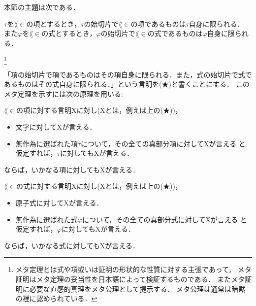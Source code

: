 	本節の主題は次である．
	\begin{screen}
		\begin{metathm}[始切片の一意性]\label{metathm:initial_segment_L_in}
			$\tau$を$\lang{\in}$の項とするとき，$\tau$の始切片で$\lang{\in}$の項であるものは$\tau$自身に限られる．
			また$\varphi$を$\lang{\in}$の式とするとき，$\varphi$の始切片で$\lang{\in}$の式であるものは$\varphi$自身に限られる．
		\end{metathm}
	\end{screen}
	
	\footnote[0]{
		メタ定理とは式や項或いは証明の形状的な性質に対する主張であって，
		メタ証明はメタ定理の妥当性を日本語によって検証するものである．
		またメタ証明に必要な直感的真理をメタ公理として提示する．
		メタ公理は通常は暗黙の裡に認められている．
	}
	
	「項の始切片で項であるものはその項自身に限られる．また，式の始切片で式であるものはその式自身に限られる．」という言明を(★)と書くことにする．
	このメタ定理を示すには次の原理を用いる:
	
	\begin{screen}
		\begin{metaaxm}
			$\lang{\in}$の項に対する言明Xに対し(Xとは，例えば上の(★))，
			\begin{itemize}
				\item 文字に対してXが言える．
				\item 無作為に選ばれた項$\tau$について，その全ての真部分項に対してXが言える
					と仮定すれば，$\tau$に対してもXが言える．
			\end{itemize}
			ならば，いかなる項に対してもXが言える．
		\end{metaaxm}
	\end{screen}
	
	\begin{screen}
		\begin{metaaxm}
			$\lang{\in}$の式に対する言明Xに対し(Xとは，例えば上の(★))，
			\begin{itemize}
				\item 原子式に対してXが言える．
				\item 無作為に選ばれた式$\varphi$について，その全ての真部分式に対してXが言える
					と仮定すれば，$\varphi$に対してもXが言える．
			\end{itemize}
			ならば，いかなる式に対してもXが言える．
		\end{metaaxm}
	\end{screen}
	

